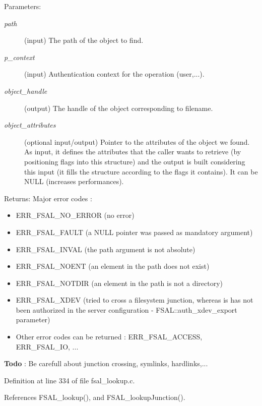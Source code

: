 \begin{Desc}
\item[Parameters:]
\begin{description}
\item[{\em path}](input) The path of the object to find. \item[{\em p\_\-context}](input) Authentication context for the operation (user,...). \item[{\em object\_\-handle}](output) The handle of the object corresponding to filename. \item[{\em object\_\-attributes}](optional input/output) Pointer to the attributes of the object we found. As input, it defines the attributes that the caller wants to retrieve (by positioning flags into this structure) and the output is built considering this input (it fills the structure according to the flags it contains). It can be NULL (increases performances).\end{description}
\end{Desc}
\begin{Desc}
\item[Returns:]Major error codes :\begin{itemize}
\item ERR\_\-FSAL\_\-NO\_\-ERROR (no error)\item ERR\_\-FSAL\_\-FAULT (a NULL pointer was passed as mandatory argument)\item ERR\_\-FSAL\_\-INVAL (the path argument is not absolute)\item ERR\_\-FSAL\_\-NOENT (an element in the path does not exist)\item ERR\_\-FSAL\_\-NOTDIR (an element in the path is not a directory)\item ERR\_\-FSAL\_\-XDEV (tried to cross a filesystem junction, whereas is has not been authorized in the server configuration - FSAL::auth\_\-xdev\_\-export parameter)\item Other error codes can be returned : ERR\_\-FSAL\_\-ACCESS, ERR\_\-FSAL\_\-IO, ... \end{itemize}
\end{Desc}


\begin{Desc}
\item[{\bf Todo}]: Be carefull about junction crossing, symlinks, hardlinks,... \end{Desc}


Definition at line 334 of file fsal\_\-lookup.c.

References FSAL\_\-lookup(), and FSAL\_\-lookupJunction().